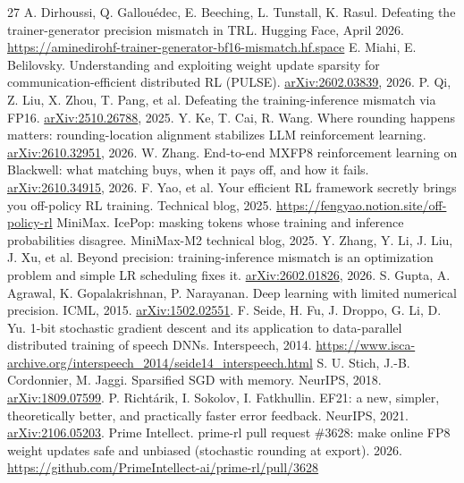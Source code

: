 \documentclass[
  10pt,
]{article}
\providecommand{\bibsep}{\itemsep}
\begin{document}
\begingroup\small\setlength{\bibsep}{3pt}
\begin{thebibliography}{27}
 A. Dirhoussi, Q. Gallouédec, E. Beeching, L. Tunstall, K. Rasul. Defeating the trainer-generator precision mismatch in TRL. Hugging Face, April 2026. \url{https://aminedirohf-trainer-generator-bf16-mismatch.hf.space}
 E. Miahi, E. Belilovsky. Understanding and exploiting weight update sparsity for communication-efficient distributed RL (PULSE). \href{https://arxiv.org/abs/2602.03839}{arXiv:2602.03839}, 2026.
 P. Qi, Z. Liu, X. Zhou, T. Pang, et al. Defeating the training-inference mismatch via FP16. \href{https://arxiv.org/abs/2510.26788}{arXiv:2510.26788}, 2025.
 Y. Ke, T. Cai, R. Wang. Where rounding happens matters: rounding-location alignment stabilizes LLM reinforcement learning. \href{https://arxiv.org/abs/2610.32951}{arXiv:2610.32951}, 2026.
 W. Zhang. End-to-end MXFP8 reinforcement learning on Blackwell: what matching buys, when it pays off, and how it fails. \href{https://arxiv.org/abs/2610.34915}{arXiv:2610.34915}, 2026.
 F. Yao, et al. Your efficient RL framework secretly brings you off-policy RL training. Technical blog, 2025. \url{https://fengyao.notion.site/off-policy-rl}
 MiniMax. IcePop: masking tokens whose training and inference probabilities disagree. MiniMax-M2 technical blog, 2025.
 Y. Zhang, Y. Li, J. Liu, J. Xu, et al. Beyond precision: training-inference mismatch is an optimization problem and simple LR scheduling fixes it. \href{https://arxiv.org/abs/2602.01826}{arXiv:2602.01826}, 2026.
 S. Gupta, A. Agrawal, K. Gopalakrishnan, P. Narayanan. Deep learning with limited numerical precision. ICML, 2015. \href{https://arxiv.org/abs/1502.02551}{arXiv:1502.02551}.
 F. Seide, H. Fu, J. Droppo, G. Li, D. Yu. 1-bit stochastic gradient descent and its application to data-parallel distributed training of speech DNNs. Interspeech, 2014. \url{https://www.isca-archive.org/interspeech\_2014/seide14\_interspeech.html}
 S. U. Stich, J.-B. Cordonnier, M. Jaggi. Sparsified SGD with memory. NeurIPS, 2018. \href{https://arxiv.org/abs/1809.07599}{arXiv:1809.07599}.
 P. Richtárik, I. Sokolov, I. Fatkhullin. EF21: a new, simpler, theoretically better, and practically faster error feedback. NeurIPS, 2021. \href{https://arxiv.org/abs/2106.05203}{arXiv:2106.05203}.
 Prime Intellect. prime-rl pull request \#3628: make online FP8 weight updates safe and unbiased (stochastic rounding at export). 2026. \url{https://github.com/PrimeIntellect-ai/prime-rl/pull/3628}

\end{thebibliography}
\end{document}
